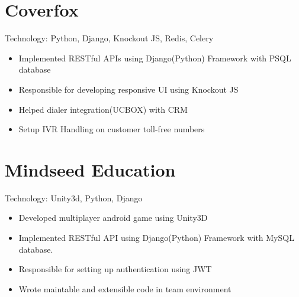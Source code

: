 \documentclass[11pt,a4paper,sans]{moderncv} %
\begin{document}
\section{Coverfox}

{Technology: Python, Django, Knockout JS, Redis, Celery}{}{}
{\begin{itemize}
\item Implemented RESTful APIs using Django(Python) Framework with PSQL database
\item Responsible for developing responsive UI using Knockout JS
\item Helped dialer integration(UCBOX) with CRM
\item Setup IVR Handling on customer toll-free numbers 
\end{itemize}}


\section{Mindseed Education}

{Technology: Unity3d, Python, Django}{}{}
{\begin{itemize}
\item Developed multiplayer android game using Unity3D
\item Implemented RESTful API using Django(Python) Framework with MySQL database.
\item Responsible for setting up authentication using JWT
\item Wrote maintable and extensible code in team environment
\end{itemize}}

\end{document}
